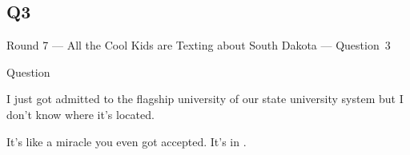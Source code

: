 \documentclass[11pt]{beamer}
\begin{document}
\subsection*{Q3}
\begin{frame}[t]{Round 7 --- All the Cool Kids are Texting about South Dakota --- \mbox{Question 3}}
\begin{block}{Question}

\begin{minipage}{0.9\textwidth}
\begin{mdframed}[
    roundcorner=7pt,
    backgroundcolor=black!5,
    linecolor=black!5,
    fontcolor=black,
    ignorelastdescenders]
\begin{flushleft}
{\small{}\selectfont{}
I just got admitted to the flagship university of our state university system but I don't know where it's located.
}
\end{flushleft}
\end{mdframed}
\end{minipage}

\hfill{}\begin{minipage}{0.9\textwidth}
\begin{mdframed}[
    roundcorner=7pt,
    backgroundcolor=blue!80!white,
    linecolor=blue!80!white,
    fontcolor=white,
    ignorelastdescenders]
\begin{flushleft}
{\small{}\selectfont{}
It's like a miracle you even got accepted. It's in \textunderscore{}\textunderscore{}\textunderscore{}\textunderscore{}\textunderscore{}\textunderscore{}.
}
\end{flushleft}
\end{mdframed}
\end{minipage}
\end{block}
\end{frame}
\end{document}
